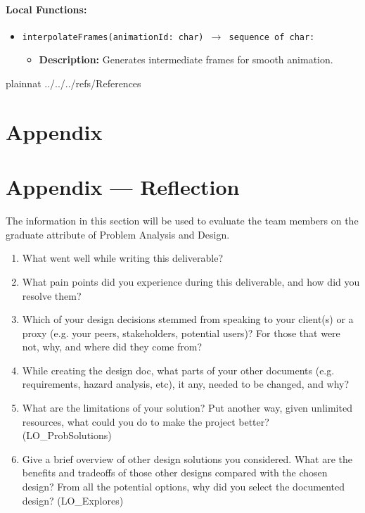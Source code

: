 \documentclass[12pt, titlepage]{article}
\begin{document}
\paragraph{Local Functions:}
\begin{itemize}
    \item \texttt{interpolateFrames(animationId: char) $\to$ sequence of char:}
    \begin{itemize}
        \item \textbf{Description:} Generates intermediate frames for smooth animation.
    \end{itemize}
\end{itemize}



 {plainnat}
 {../../../refs/References}

\newpage

\section{Appendix} \label{Appendix}


\newpage{}

\section*{Appendix --- Reflection}


The information in this section will be used to evaluate the team members on the
graduate attribute of Problem Analysis and Design.



\begin{enumerate}
  \item What went well while writing this deliverable? 
  \item What pain points did you experience during this deliverable, and how
    did you resolve them?
  \item Which of your design decisions stemmed from speaking to your client(s)
  or a proxy (e.g. your peers, stakeholders, potential users)? For those that
  were not, why, and where did they come from?
  \item While creating the design doc, what parts of your other documents (e.g.
  requirements, hazard analysis, etc), it any, needed to be changed, and why?
  \item What are the limitations of your solution?  Put another way, given
  unlimited resources, what could you do to make the project better? (LO\_ProbSolutions)
  \item Give a brief overview of other design solutions you considered.  What
  are the benefits and tradeoffs of those other designs compared with the chosen
  design?  From all the potential options, why did you select the documented design?
  (LO\_Explores)
\end{enumerate}
\end{document}
